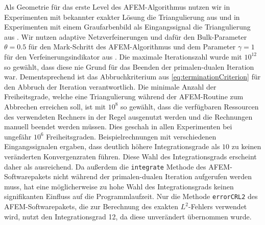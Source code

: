 Als Geometrie für das erste Level des AFEM-Al\-go\-rith\-mus nutzen wir in
Experimenten mit bekannter exakter Lösung die Triangulierung aus
 und in Experimenten mit einem Graufarbenbild als
Eingangssignal die Triangulierung aus .
Wir nutzen adaptive Netzverfeinerungen und dafür den Bulk-Parameter
$\theta=0.5$ für den Mark-Schritt des AFEM-Algorithmus und dem Parameter
$\gamma=1$ für den Verfeinerungsindikator aus .
Die maximale Iterationszahl wurde mit $10^{12}$ so gewählt, dass diese nie
Grund für das Beenden der primalen-dualen Iteration war.
Dementsprechend ist das Abbruchkriterium aus \eqref{eq:terminationCriterion}
für den Abbruch der Iteration verantwortlich.
Die minimale Anzahl der Freiheitsgrade, welche eine Triangulierung während der
AFEM-Routine zum Abbrechen erreichen soll, ist mit $10^8$ so gewählt, dass die
verfügbaren Ressourcen des verwendeten Rechners in der Regel ausgenutzt
werden und die Rechnungen manuell beendet werden müssen.
Dies geschah in allen Experimenten bei ungefähr $10^6$ Freiheitsgraden.
Beispielrechnungen mit verschiedenen Eingangssignalen ergaben, dass deutlich
höhere Integrationsgrade als $10$ zu keinen veränderten Konvergenzraten
führen. 
Diese Wahl des Integrationsgrads erscheint daher als ausreichend.
Da außerdem die \texttt{integrate} Methode des AFEM-Softwarepakets \cite{Car09}
nicht während der primalen-dualen Iteration aufgerufen werden muss, hat eine
möglicherweise zu hohe Wahl des Integrationsgrads keinen signifikanten Einfluss
auf die Programmlaufzeit.
Nur die Methode \texttt{errorCRL2} des AFEM-Softwarepakets, die zur Berechnung
des exakten $L^2$-Fehlers verwendet wird, nutzt den Integrationsgrad 12, da
diese unverändert übernommen wurde.

